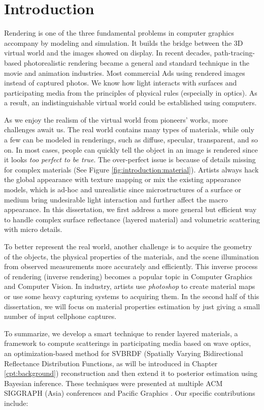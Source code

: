 \chapter{Introduction}
\label{cpt:introduction}

Rendering is one of the three fundamental problems in computer graphics accompany by modeling and simulation. It builds the bridge between the 3D virtual world and the images showed on display. In recent decades, path-tracing-based photorealistic rendering became a general and standard technique in the movie and animation industries. Most commercial Ads using rendered images instead of captured photos. We know how light interacts with surfaces and participating media from the principles of physical rules (especially in optics). As a result, an indistinguishable virtual world could be established using computers.  

As we enjoy the realism of the virtual world from pioneers' works, more challenges await us. The real world contains many types of materials, while only a few can be modeled in renderings, such as diffuse, specular, transparent, and so on. In most cases, people can quickly tell the object in an image is rendered since it looks \emph{too perfect to be true}. The over-perfect issue is because of details missing for complex materials (See Figure \ref{fig:introduction:material}). Artists always hack the global appearance with texture mapping or mix the existing appearance models, which is ad-hoc and unrealistic since microstructures of a surface or medium bring undesirable light interaction and further affect the macro appearance. In this dissertation, we first address a more general but efficient way to handle complex surface reflectance (layered material) and volumetric scattering with micro details.



To better represent the real world, another challenge is to acquire the geometry of the objects, the physical properties of the materials, and the scene illumination from observed measurements more accurately and efficiently. This inverse process of rendering (inverse rendering) becomes a popular topic in Computer Graphics and Computer Vision. In industry, artists use \emph{photoshop} to create material maps or use some heavy capturing systems to acquiring them. In the second half of this dissertation, we will focus on material properties estimation by just giving a small number of input cellphone captures.

To summarize, we develop a smart technique to render layered materials, a framework to compute scatterings in participating media based on wave optics, an optimization-based method for SVBRDF (Spatially Varying Bidirectional Reflectance Distribution Functions,
as will be introduced in Chapter \ref{cpt:background}) reconstruction and then extend it to posterior estimation using Bayesian inference.
These techniques were presented at multiple ACM SIGGRAPH (Asia) conferences \cite{guo2018position, guo2021beyond, guo2020materialgan} and Pacific Graphics \cite{guo2020bayesian}. Our specific contributions include:

